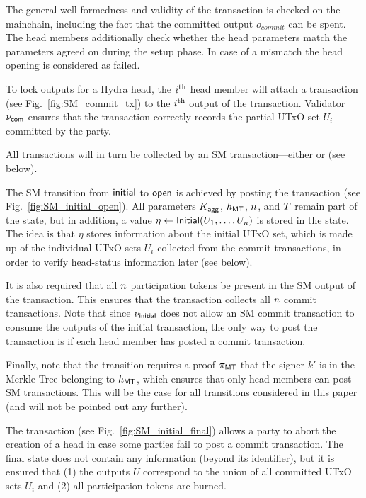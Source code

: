 The general well-formedness and validity of the \mtxInit{} transaction is
checked on the mainchain, including the fact that the committed output
$o_{commit}$ can be spent. The head members additionally check whether the head
parameters match the parameters agreed on during the setup phase. In case of a
mismatch the head opening is considered as failed.



To lock outputs %
for a Hydra head, the $i^{\text{th}}$
head member will attach a \mtxCom{} transaction (see
Fig.~\ref{fig:SM_commit_tx}) to the $i^{\text{th}}$ output of the
\mtxInit{} transaction.  Validator $\nu_\mathsf{com}$ ensures that the \mtxCom{}
transaction correctly records the partial UTxO set $U_i$ committed
by the party.

All \mtxCom{} transactions will in turn be collected by an SM
transaction---either \mtxCCom{} or \mtxAbort{} (see below).




 The SM transition from $\mathsf{initial}$
to $\mathsf{open}$ is achieved by posting the \mtxCCom{} transaction (see
Fig.~\ref{fig:SM_initial_open}).  All parameters $K_{\mathsf{agg}}$, $h_{\mathsf{MT}}$,
$n$, and $T$ remain part of the state, but in addition, a value
$\eta \gets \mathsf{Initial}(U_1,\ldots,U_n)$ is stored in the state.
The idea is that $\eta$ stores information about the initial UTxO set,
which is made up of the individual UTxO sets $U_i$ collected from the
commit transactions, in order to verify head-status information later
(see below).

It is also required that all $n$ participation tokens be present in
the SM output of the \mtxCCom{} transaction.  This ensures that the
\mtxCCom{} transaction collects all $n$ commit transactions.  Note
that since $\nu_\mathsf{initial}$ does not allow an SM commit transaction to
consume the outputs of the initial transaction, the only way to post
the \mtxCCom{} transaction is if each head member has posted a commit
transaction.



Finally, note that the transition requires a proof $\pi_{\mathsf{MT}}$ that the
signer $k'$ is in the Merkle Tree belonging to $h_{\mathsf{MT}}$, which ensures
that only head members can post SM transactions.  This will be the
case for all transitions considered in this paper (and will not be
pointed out any further).


 The \mtxAbort{} transaction
(see Fig.~\ref{fig:SM_initial_final}) allows a party to abort the
creation of a head in case some parties fail to post a commit
transaction.  The final state does not contain any information (beyond
its identifier), but it is ensured that (1) the outputs $U$ correspond
to the union of all committed UTxO sets $U_i$ and (2) all
participation tokens are burned.


